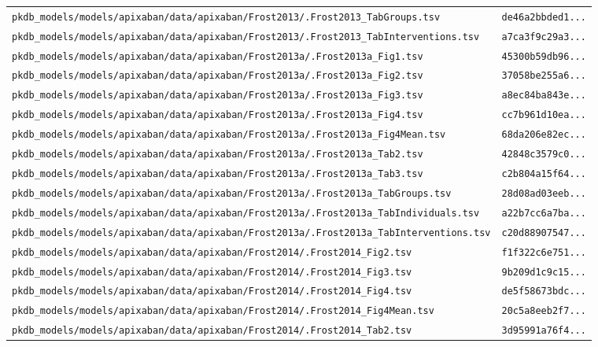 \documentclass{article}
\begin{document}
\begin{longtable}{ll}
\texttt{pkdb\_models/models/apixaban/data/apixaban/Frost2013/.Frost2013\_TabGroups.tsv} & \texttt{de46a2bbded1...} \\
\texttt{pkdb\_models/models/apixaban/data/apixaban/Frost2013/.Frost2013\_TabInterventions.tsv} & \texttt{a7ca3f9c29a3...} \\
\texttt{pkdb\_models/models/apixaban/data/apixaban/Frost2013a/.Frost2013a\_Fig1.tsv} & \texttt{45300b59db96...} \\
\texttt{pkdb\_models/models/apixaban/data/apixaban/Frost2013a/.Frost2013a\_Fig2.tsv} & \texttt{37058be255a6...} \\
\texttt{pkdb\_models/models/apixaban/data/apixaban/Frost2013a/.Frost2013a\_Fig3.tsv} & \texttt{a8ec84ba843e...} \\
\texttt{pkdb\_models/models/apixaban/data/apixaban/Frost2013a/.Frost2013a\_Fig4.tsv} & \texttt{cc7b961d10ea...} \\
\texttt{pkdb\_models/models/apixaban/data/apixaban/Frost2013a/.Frost2013a\_Fig4Mean.tsv} & \texttt{68da206e82ec...} \\
\texttt{pkdb\_models/models/apixaban/data/apixaban/Frost2013a/.Frost2013a\_Tab2.tsv} & \texttt{42848c3579c0...} \\
\texttt{pkdb\_models/models/apixaban/data/apixaban/Frost2013a/.Frost2013a\_Tab3.tsv} & \texttt{c2b804a15f64...} \\
\texttt{pkdb\_models/models/apixaban/data/apixaban/Frost2013a/.Frost2013a\_TabGroups.tsv} & \texttt{28d08ad03eeb...} \\
\texttt{pkdb\_models/models/apixaban/data/apixaban/Frost2013a/.Frost2013a\_TabIndividuals.tsv} & \texttt{a22b7cc6a7ba...} \\
\texttt{pkdb\_models/models/apixaban/data/apixaban/Frost2013a/.Frost2013a\_TabInterventions.tsv} & \texttt{c20d88907547...} \\
\texttt{pkdb\_models/models/apixaban/data/apixaban/Frost2014/.Frost2014\_Fig2.tsv} & \texttt{f1f322c6e751...} \\
\texttt{pkdb\_models/models/apixaban/data/apixaban/Frost2014/.Frost2014\_Fig3.tsv} & \texttt{9b209d1c9c15...} \\
\texttt{pkdb\_models/models/apixaban/data/apixaban/Frost2014/.Frost2014\_Fig4.tsv} & \texttt{de5f58673bdc...} \\
\texttt{pkdb\_models/models/apixaban/data/apixaban/Frost2014/.Frost2014\_Fig4Mean.tsv} & \texttt{20c5a8eeb2f7...} \\
\texttt{pkdb\_models/models/apixaban/data/apixaban/Frost2014/.Frost2014\_Tab2.tsv} & \texttt{3d95991a76f4...} \\

\end{longtable}
\end{document}
